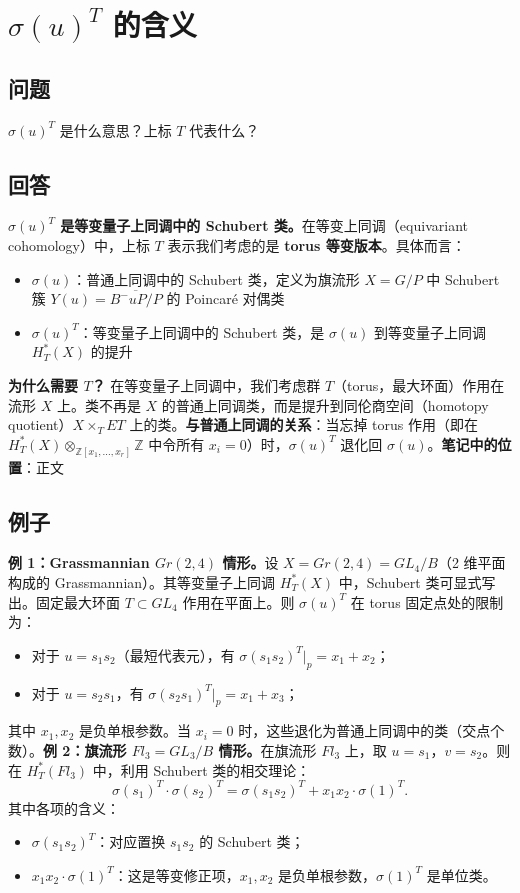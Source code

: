 \section{$\sigma(u)^T$ 的含义}\label{sec:sigma-u-T}
\subsection{问题}
$\sigma(u)^T$ 是什么意思？上标 $T$ 代表什么？
\subsection{回答}
\textbf{$\sigma(u)^T$ 是等变量子上同调中的 Schubert 类。}在等变上同调（equivariant cohomology）中，上标 $T$ 表示我们考虑的是 \textbf{torus 等变版本}。具体而言：
\begin{itemize}
\item $\sigma(u)$：普通上同调中的 Schubert 类，定义为旗流形 $X = G/P$ 中 Schubert 簇 $Y(u) = \overline{B^-uP/P}$ 的 Poincaré 对偶类\item $\sigma(u)^T$：等变量子上同调中的 Schubert 类，是 $\sigma(u)$ 到等变量子上同调 $H_T^*(X)$ 的提升
\end{itemize}

\textbf{为什么需要 $T$？} 在等变量子上同调中，我们考虑群 $T$（torus，最大环面）作用在流形 $X$ 上。类不再是 $X$ 的普通上同调类，而是提升到同伦商空间（homotopy quotient）$X \times_T ET$ 上的类。\textbf{与普通上同调的关系}：当忘掉 torus 作用（即在 $H_T^*(X) \otimes_{\mathbb{Z}[x_1,\ldots,x_r]} \mathbb{Z}$ 中令所有 $x_i = 0$）时，$\sigma(u)^T$ 退化回 $\sigma(u)$。\textbf{笔记中的位置}：正文 
\subsection{例子}\textbf{例 1：Grassmannian $Gr(2,4)$ 情形。}设 $X = Gr(2,4) = GL_4/B$（2 维平面构成的 Grassmannian）。其等变量子上同调 $H_T^*(X)$ 中，Schubert 类可显式写出。固定最大环面 $T \subset GL_4$ 作用在平面上。则 $\sigma(u)^T$ 在 torus 固定点处的限制为：
\begin{itemize}
\item 对于 $u = s_1 s_2$（最短代表元），有 $\sigma(s_1 s_2)^T|_p = x_1 + x_2$；
\item 对于 $u = s_2 s_1$，有 $\sigma(s_2 s_1)^T|_p = x_1 + x_3$；
\end{itemize}其中 $x_1, x_2$ 是负单根参数。当 $x_i = 0$ 时，这些退化为普通上同调中的类（交点个数）。\textbf{例 2：旗流形 $Fl_3 = GL_3/B$ 情形。}在旗流形 $Fl_3$ 上，取 $u = s_1$，$v = s_2$。则在 $H_T^*(Fl_3)$ 中，利用 Schubert 类的相交理论：$$\sigma(s_1)^T \cdot \sigma(s_2)^T = \sigma(s_1 s_2)^T + x_1 x_2 \cdot \sigma(1)^T.$$其中各项的含义：
\begin{itemize}
\item $\sigma(s_1 s_2)^T$：对应置换 $s_1 s_2$ 的 Schubert 类；\item $x_1 x_2 \cdot \sigma(1)^T$：这是等变修正项，$x_1, x_2$ 是负单根参数，$\sigma(1)^T$ 是单位类。
\end{itemize}

